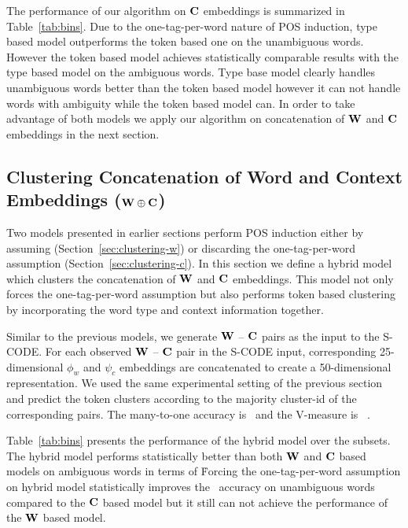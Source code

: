 The performance of our algorithm on ${\bf C}$ embeddings is summarized in
Table~\ref{tab:bins}.  Due to the one-tag-per-word nature of POS
induction, type based model outperforms the token based one on the
unambiguous words.  However the token based model achieves
statistically comparable results with the type based model on the
ambiguous words.  Type base model clearly handles unambiguous words
better than the token based model however it can not handle words with
ambiguity while the token based model can.  In order to take advantage
of both models we apply our algorithm on concatenation of ${\bf W}$ and ${\bf C}$
embeddings in the next section.

\subsection{Clustering Concatenation of Word and Context Embeddings (${\bf W}\oplus{\bf C}$)}
\label{sec:clustering-concatenation}

Two models presented in earlier sections perform POS induction either
by assuming (Section~\ref{sec:clustering-w}) or discarding the
one-tag-per-word assumption (Section~\ref{sec:clustering-c}).  In this
section we define a hybrid model which clusters the concatenation of
${\bf W}$ and ${\bf C}$ embeddings.  This model not only forces the
one-tag-per-word assumption but also performs token based clustering
by incorporating the word type and context information together.

Similar to the previous models, we generate ${\bf W}$ -- ${\bf C}$
pairs as the input to the S-CODE.  For each observed ${\bf W}$ --
${\bf C}$ pair in the S-CODE input, corresponding 25-dimensional
$\phi_w$ and $\psi_c$ embeddings are concatenated to create a
50-dimensional representation.  We used the same experimental setting
of the previous section and predict the token clusters according to
the majority cluster-id of the corresponding pairs.  The many-to-one
accuracy is \wsxymto\ and the V-measure is \wsxyvm\ .

Table~\ref{tab:bins} presents the performance of the hybrid model over
the subsets.  The hybrid model performs statistically better than both
${\bf W}$ and ${\bf C}$ based models on ambiguous words in terms of
\mto\.  Forcing the one-tag-per-word assumption on hybrid model
statistically improves the \mto\ accuracy on unambiguous words
compared to the ${\bf C}$ based model but it still can not achieve the
performance of the ${\bf W}$ based model.



